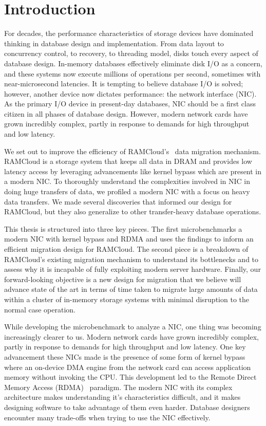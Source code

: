 
\chapter{Introduction}

For decades, the performance characteristics of storage devices have dominated
     thinking in database design and implementation. From data layout to
concurrency control, to recovery, to threading model, disks touch every aspect
of database design. In-memory databases effectively eliminate disk I/O as a
concern, and these systems now execute millions of operations per second,
sometimes with near-microsecond latencies.  It is tempting to believe 
database I/O is solved; however, another device now dictates
performance: the network interface (NIC). As the primary I/O device in present-day databases,
NIC should be a first class citizen in all phases of database design.
However, modern network cards have grown incredibly complex, partly in response
to demands for high throughput and low latency.

We set out to improve the efficiency of RAMCloud's~\cite{ramcloud} data migration mechanism. 
RAMCloud is a storage system that keeps all data in DRAM and provides low latency access by
leveraging advancements like kernel bypass which are present in a modern NIC.
To thoroughly understand the complexities involved in NIC in doing huge
transfers of data, we profiled a modern NIC with a focus on heavy data transfers.
 We made several discoveries that informed our design for RAMCloud,
 but they also generalize to other transfer-heavy database operations. 

This thesis is structured into three key pieces. The first microbenchmarks a modern NIC 
with kernel bypass and RDMA and uses the findings to inform an efficient   migration design for RAMCloud.
The second piece is a breakdown of RAMCloud’s existing migration mechanism to understand its bottlenecks
and to assess why it is incapable of fully exploiting modern server hardware. 
Finally, our forward-looking objective is a new design for migration that we believe will advance state of the art
in terms of time taken to migrate large amounts of data within a cluster of in-memory storage systems
with minimal disruption to the normal case operation.

While developing the microbenchmark to analyze a NIC, one thing was becoming increasingly clearer to us.
Modern network cards have grown incredibly complex, partly in response to
demands for high throughput and low latency. One key advancement these NICs made 
is the presence of some form of kernel bypass where an on-device DMA engine from the network card 
can access application memory without invoking the CPU. This development led to the Remote 
Direct Memory Access (RDMA)~\cite{rdmapatent} paradigm. The modern NIC with its complex architecture
makes understanding it's characteristics difficult, and it makes designing software to take advantage
of them even harder. Database designers encounter many trade-offs when trying to use the NIC effectively.

